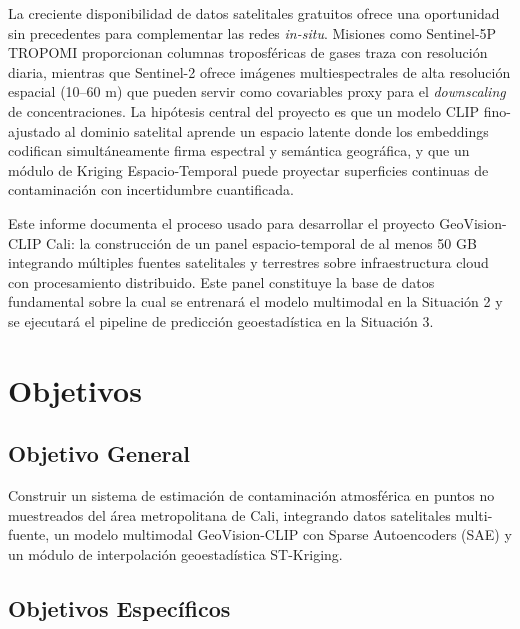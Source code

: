 \documentclass[10pt,a4paper,twocolumn]{article}
\begin{document}
La creciente disponibilidad de datos satelitales gratuitos ofrece una oportunidad sin precedentes para complementar las redes \textit{in-situ}. Misiones como Sentinel-5P TROPOMI proporcionan columnas troposféricas de gases traza con resolución diaria, mientras que Sentinel-2 ofrece imágenes multiespectrales de alta resolución espacial (10--60 m) que pueden servir como covariables proxy para el \textit{downscaling} de concentraciones. La hipótesis central del proyecto es que un modelo CLIP fino-ajustado al dominio satelital aprende un espacio latente donde los embeddings codifican simultáneamente firma espectral y semántica geográfica, y que un módulo de Kriging Espacio-Temporal puede proyectar superficies continuas de contaminación con incertidumbre cuantificada.

Este informe documenta el proceso usado para desarrollar el proyecto GeoVision-CLIP Cali: la construcción de un panel espacio-temporal de al menos 50 GB integrando múltiples fuentes satelitales y terrestres sobre infraestructura cloud con procesamiento distribuido. Este panel constituye la base de datos fundamental sobre la cual se entrenará el modelo multimodal en la Situación 2 y se ejecutará el pipeline de predicción geoestadística en la Situación 3.

\section{Objetivos}

\subsection{Objetivo General}

Construir un sistema de estimación de contaminación atmosférica en puntos no muestreados del área metropolitana de Cali, integrando datos satelitales multi-fuente, un modelo multimodal GeoVision-CLIP con Sparse Autoencoders (SAE) y un módulo de interpolación geoestadística ST-Kriging.

\subsection{Objetivos Específicos}
\end{document}
